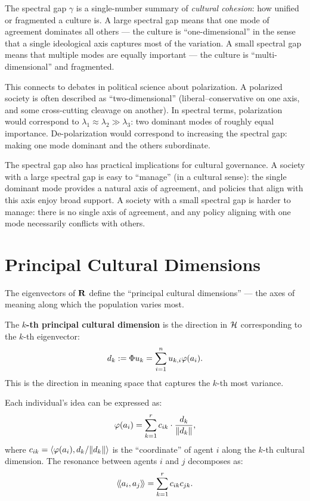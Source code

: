 \begin{interpretation}
\label{interp:spectral-gap}
The spectral gap $\gamma$ is a single-number summary of \emph{cultural
cohesion}: how unified or fragmented a culture is. A large spectral gap means
that one mode of agreement dominates all others --- the culture is
``one-dimensional'' in the sense that a single ideological axis captures most
of the variation. A small spectral gap means that multiple modes are equally
important --- the culture is ``multi-dimensional'' and fragmented.

This connects to debates in political science about polarization. A polarized
society is often described as ``two-dimensional'' (liberal--conservative on one
axis, and some cross-cutting cleavage on another). In spectral terms,
polarization would correspond to $\lambda_1 \approx \lambda_2 \gg \lambda_3$:
two dominant modes of roughly equal importance. De-polarization would
correspond to increasing the spectral gap: making one mode dominant and the
others subordinate.

The spectral gap also has practical implications for cultural governance. A
society with a large spectral gap is easy to ``manage'' (in a cultural sense):
the single dominant mode provides a natural axis of agreement, and policies
that align with this axis enjoy broad support. A society with a small spectral
gap is harder to manage: there is no single axis of agreement, and any policy
aligning with one mode necessarily conflicts with others.
\end{interpretation}


\section{Principal Cultural Dimensions}

The eigenvectors of $\mathbf{R}$ define the ``principal cultural dimensions'' ---
the axes of meaning along which the population varies most.

\begin{definition}
\label{def:pcd}
The \textbf{$k$-th principal cultural dimension} is the direction in $\mathcal{H}$
corresponding to the $k$-th eigenvector:
\[
  d_k := \Phi u_k = \sum_{i=1}^n u_{k,i} \varphi(a_i).
\]
This is the direction in meaning space that captures the $k$-th most variance.
\end{definition}

\begin{theorem}
\label{thm:reconstruction}
Each individual's idea can be expressed as:
\[
  \varphi(a_i) = \sum_{k=1}^r c_{ik} \cdot \frac{d_k}{\lVert d_k \rVert},
\]
where $c_{ik} = \langle \varphi(a_i), d_k/\lVert d_k \rVert \rangle$ is the ``coordinate'' of
agent $i$ along the $k$-th cultural dimension. The resonance between agents
$i$ and $j$ decomposes as:
\[
  \langle\!\langle a_i, a_j \rangle\!\rangle = \sum_{k=1}^r c_{ik} c_{jk}.
\]
\end{theorem}

